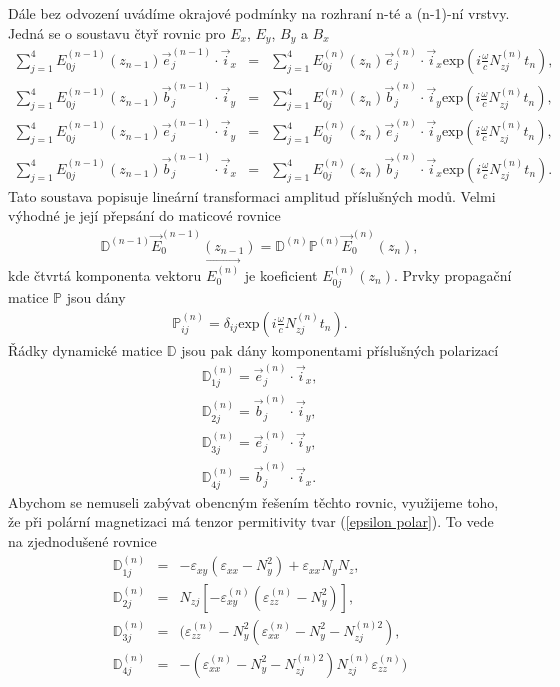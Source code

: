Dále bez odvození uvádíme okrajové podmínky na rozhraní n-té a (n-1)-ní vrstvy. Jedná se o soustavu čtyř rovnic pro $E_x$, $E_y$, $B_y$ a $B_x$
\begin{eqnarray}
\sum^4_{j=1}E_{0j}^{(n-1)}(z_{n-1})\vec{e}_j^{(n-1)}\cdot\vec{i}_x &=& \sum^4_{j=1}E_{0j}^{(n)}(z_n)\vec{e}_j^{(n)}\cdot\vec{i}_x \mbox{exp}\left(i\frac{\omega}{c}N_{zj}^{(n)}t_n\right), \\
\sum^4_{j=1}E_{0j}^{(n-1)}(z_{n-1})\vec{b}_j^{(n-1)}\cdot\vec{i}_y &=& \sum^4_{j=1}E_{0j}^{(n)}(z_n)\vec{b}_j^{(n)}\cdot\vec{i}_y \mbox{exp}\left(i\frac{\omega}{c}N_{zj}^{(n)}t_n\right), \\
\sum^4_{j=1}E_{0j}^{(n-1)}(z_{n-1})\vec{e}_j^{(n-1)}\cdot\vec{i}_y &=& \sum^4_{j=1}E_{0j}^{(n)}(z_n)\vec{e}_j^{(n)}\cdot\vec{i}_y \mbox{exp}\left(i\frac{\omega}{c}N_{zj}^{(n)}t_n\right), \\
\sum^4_{j=1}E_{0j}^{(n-1)}(z_{n-1})\vec{b}_j^{(n-1)}\cdot\vec{i}_x &=& \sum^4_{j=1}E_{0j}^{(n)}(z_n)\vec{b}_j^{(n)}\cdot\vec{i}_x \mbox{exp}\left(i\frac{\omega}{c}N_{zj}^{(n)}t_n\right).
\end{eqnarray}
Tato soustava popisuje lineární transformaci amplitud příslušných modů. Velmi výhodné je její přepsání do maticové rovnice
\begin{eqnarray}
\mathbb{D}^{(n-1)}\vec{E}_0^{(n-1)}(z_{n-1})=\mathbb{D}^{(n)}\mathbb{P}^{(n)}\vec{E}^{(n)}_0(z_n),
\end{eqnarray}
kde čtvrtá komponenta vektoru $\vec{E_0^{(n)}}$ je koeficient $E^{(n)}_{0j}(z_n)$. Prvky propagační matice $\mathbb{P}$ jsou dány
\begin{eqnarray}
\mathbb{P}_{ij}^{(n)}=\delta_{ij} \mbox{exp}\left(i\frac{\omega}{c}N_{zj}^{(n)}t_n\right).
\end{eqnarray}
Řádky dynamické matice $\mathbb{D}$ jsou pak dány komponentami příslušných polarizací
\begin{eqnarray}
\mathbb{D}_{1j}^{(n)}=\vec{e}_j^{(n)}\cdot\vec{i}_x, \\
\mathbb{D}_{2j}^{(n)}=\vec{b}_j^{(n)}\cdot\vec{i}_y, \\
\mathbb{D}_{3j}^{(n)}=\vec{e}_j^{(n)}\cdot\vec{i}_y, \\
\mathbb{D}_{4j}^{(n)}=\vec{b}_j^{(n)}\cdot\vec{i}_x.
\end{eqnarray}
Abychom se nemuseli zabývat obencným řešením těchto rovnic, využijeme toho, že při polární magnetizaci má tenzor permitivity tvar (\ref{epsilon polar}). To vede na zjednodušené rovnice
\begin{eqnarray}
\mathbb{D}_{1j}^{(n)}&=& -\varepsilon_{xy}(\varepsilon_{xx}-N_y^2)+\varepsilon_{xx}N_yN_z, \\
\mathbb{D}_{2j}^{(n)}&=&N_{zj}[-\varepsilon_{xy}^{(n)}(\varepsilon_{zz}^{(n)}-N_y^2)], \\
\mathbb{D}_{3j}^{(n)}&=&(\varepsilon_{zz}^{(n)}-N^2_y(\varepsilon_{xx}^{(n)}-N_y^2-N_{zj}^{(n)2}), \\
\mathbb{D}_{4j}^{(n)}&=&-(\varepsilon_{xx}^{(n)}-N_y^2-N_{zj}^{(n)2})N_{zj}^{(n)}\varepsilon_{zz}^{(n)})
\end{eqnarray}
